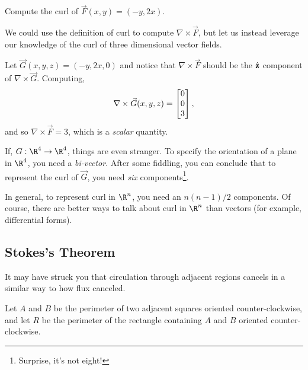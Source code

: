 \begin{example}
	Compute the curl of $\vec F(x,y) = (-y,2x)$.

	We could use the definition of curl to compute $\nabla \times \vec F$, but let
	us instead leverage our knowledge of the curl of three dimensional vector fields.

	Let $\vec G(x,y,z) = (-y, 2x, 0)$ and notice that $\nabla \times \vec F$ should be the
	${\hat {\mathbf z}}$ component of $\nabla \times \vec G$.  Computing,
	\[
		\nabla \times \vec G(x,y,z) = \mat{0\\0\\3},
	\]
	and so $\nabla \times \vec F=3$, which is a \emph{scalar} quantity.
\end{example}

If, $G:\R^4\to\R^4$, things are even stranger.  To specify the orientation
of a plane in $\R^4$, you need a \emph{bi-vector}.  After 
some fiddling, you can conclude that to represent the curl of $\vec G$, you
need \emph{six} components\footnote{ Surprise, it's not eight!}.

In general, to represent curl in $\R^n$, you need an $n(n-1)/2$ components.
Of course, there are better ways to talk about curl in $\R^n$ than vectors
(for example, differential forms).

\subsection{Stokes's Theorem}

It may have struck you that circulation through adjacent regions cancels
in a similar way to how flux canceled.

Let $A$ and $B$ be the perimeter of two adjacent squares oriented counter-clockwise,
and let $R$ be the perimeter of the rectangle containing $A$ and $B$ oriented 
counter-clockwise.

